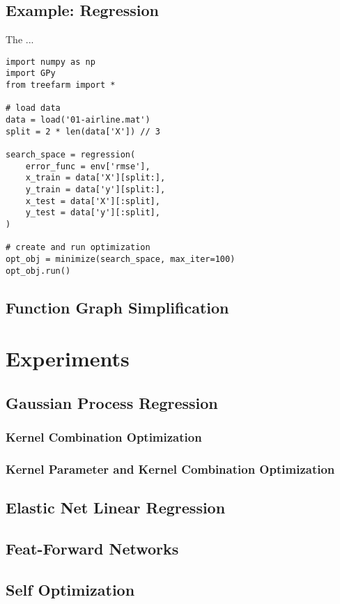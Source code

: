 \documentclass[english]{article}
\begin{document}
\subsection{Example: Regression}
The ...



\begin{verbatim}
import numpy as np
import GPy
from treefarm import *

# load data
data = load('01-airline.mat')
split = 2 * len(data['X']) // 3

search_space = regression(
    error_func = env['rmse'],
    x_train = data['X'][split:],
    y_train = data['y'][split:],
    x_test = data['X'][:split],
    y_test = data['y'][:split],
)

# create and run optimization
opt_obj = minimize(search_space, max_iter=100)
opt_obj.run()

\end{verbatim}


\subsection{Function Graph Simplification}

\section{Experiments}


\subsection{Gaussian Process Regression}
\subsubsection{Kernel Combination Optimization}
\subsubsection{Kernel Parameter and Kernel Combination Optimization}
\subsection{Elastic Net Linear Regression}
\subsection{Feat-Forward Networks}
\subsection{Self Optimization}
\end{document}
